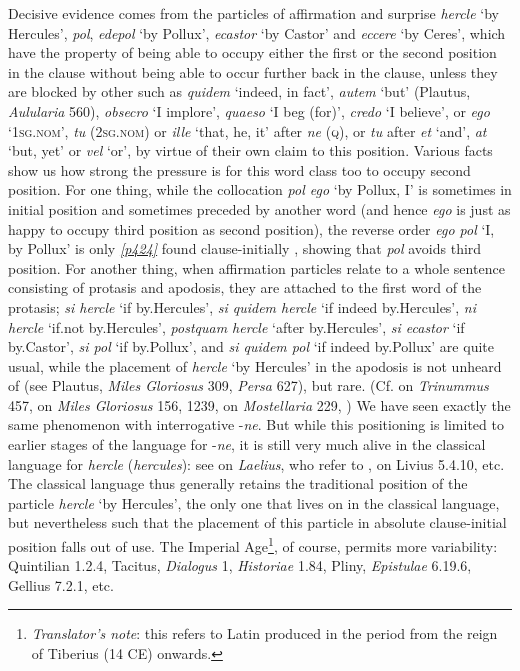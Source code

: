 Decisive evidence comes from the particles of affirmation and surprise \emph{hercle} `by Hercules', \emph{pol}, \emph{edepol} `by Pollux', \emph{ecastor} `by Castor' and \emph{eccere} `by Ceres', which have the property of being able to occupy either the first or the second position in the clause without being able to occur further back in the clause, unless they are blocked by other  such as \emph{quidem} `indeed, in fact', \emph{autem} `but' (Plautus, \textit{Aulularia} 560), \emph{obsecro} `I implore', \emph{quaeso} `I beg (for)', \emph{credo} `I believe', or \emph{ego} `\textsc{1sg.nom}', \emph{tu} (\textsc{2sg.nom}) or \emph{ille} `that, he, it' after \emph{ne} (\textsc{q}), or \emph{tu} after \emph{et} `and', \emph{at} `but, yet' or \emph{vel} `or', by virtue of their own claim to this position. Various facts show us how strong the pressure is for this word class too to occupy second position. For one thing, while the collocation \emph{pol ego} `by Pollux, I' is sometimes in initial position and sometimes preceded by another word (and hence \emph{ego} is just as happy to occupy third position as second position), the reverse order \emph{ego pol} `I, by Pollux' is only \hyperlink{p424}{\emph{[p424]}} found clause-initially \citep[62]{Kellerhoff1891}, showing that \emph{pol} avoids third position. For another thing, when affirmation particles relate to a whole sentence consisting of protasis and apodosis, they are attached to the first word of the protasis; \emph{si hercle} `if by.Hercules', \emph{si quidem hercle} `if indeed by.Hercules', \emph{ni hercle} `if.not by.Hercules', \emph{postquam hercle} `after by.Hercules', \emph{si ecastor} `if by.Castor', \emph{si pol} `if by.Pollux', and \emph{si quidem pol} `if indeed by.Pollux' are quite usual, while the placement of \emph{hercle} `by Hercules' in the apodosis is not unheard of (see Plautus, \textit{Miles Gloriosus} 309, \textit{Persa} 627), but rare. (Cf. \citealp{BrixNiemeyer1888} on \textit{Trinummus} 457, \citealp{Lorenz1883,Lorenz1886} on \textit{Miles Gloriosus} 156, 1239, on \textit{Mostellaria} 229, \citealp[72f.]{Kellerhoff1891}) We have seen exactly the same phenomenon with interrogative -\emph{ne}. But while this positioning is limited to earlier stages of the language for -\emph{ne}, it is still very much alive in the classical language for \emph{hercle} (\emph{hercules}): see \citet[477, §78]{SeyffertMueller1876} on \textit{Laelius}, who refer to \citet[43, 239, 269]{Wichert1856}, \citet{Weissenborn1853} on Livius 5.4.10, etc. The classical language thus generally retains the traditional position of the particle \emph{hercle} `by Hercules', the only one that lives on in the classical language, but nevertheless such that the placement of this particle in absolute clause-initial position falls out of use. The Imperial Age\footnote{\emph{Translator's note}: this refers to Latin produced in the period from the reign of Tiberius (14 CE) onwards.}, of course, permits more variability: Quintilian 1.2.4, Tacitus, \textit{Dialogus} 1, \textit{Historiae} 1.84, Pliny, \textit{Epistulae} 6.19.6, Gellius 7.2.1, etc.

